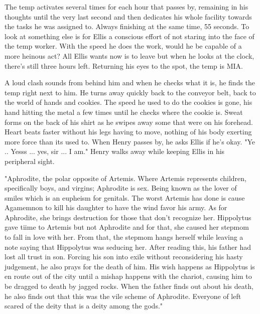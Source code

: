 \begin{Document}
       The temp activates several times for each hour that passes by, remaining in his thoughts until the very last second and then dedicates his whole facility
    towards the tasks he was assigned to. Always finishing at the same time, 55 seconds. To look at something else is for Ellis a conscious effort of not staring
    into the face of the temp worker. With the speed he does the work, would he be capable of a more heinous act? All Ellis wants now is to leave but when he
    looks at the clock, there's still three hours left. Returning his eyes to the spot, the temp is MIA.

        A loud clash sounds from behind him and when he checks what it is, he finds the temp right next to him. He turns away quickly back to the conveyor belt,
    back to the world of hands and cookies. The speed he used to do the cookies is gone, his hand hitting the metal a few times until he checks where the cookie
    is. Sweat forms on the back of his shirt as he swipes away some that were on his forehead. Heart beats faster without his legs having to move, nothing of
    his body exerting more force than its used to. When Henry passes by, he asks Ellis if he's okay. "Ye .. Yesss ... yes, sir ... I am." Henry walks away while
    keeping Ellis in his peripheral sight.

        "Aphrodite, the polar opposite of Artemis. Where Artemis represents children, specifically boys, and virgins; Aphrodite is sex. Being known as the lover
    of smiles which is an eupheism for genitals. The worst Artemis has done is cause Agamemnon to kill his daughter to have the wind favor his army. As for
    Aphrodite, she brings destruction for those that don't recognize her. Hippolytus gave tiime to Artemis but not Aphrodite and for that, she caused her stepmom
    to fall in love with her. From that, the stepmom hangs herself while leaving a note saying that Hippolytus was seducing her. After reading this, his
    father had lost all trust in son. Forcing his son into exile without reconsidering his hasty judgement, he also prays for the death of him. His wish happens
    as Hippolytus is en route out of the city until a mishap happens with the chariot, causing him to be dragged to death by jagged rocks. When the father finds
    out about his death, he also finds out that this was the vile scheme of Aphrodite. Everyone of left scared of the deity that is a deity among the gods."


\end{Document}
